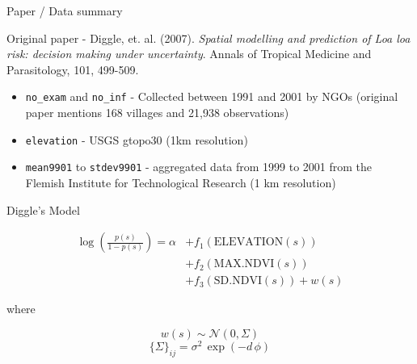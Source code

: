 \documentclass[11pt,ignorenonframetext,]{beamer}
\providecommand{\tightlist}{%
  \setlength{\itemsep}{0pt}\setlength{\parskip}{0pt}}
\begin{document}
\begin{frame}[fragile]{Paper / Data summary}
\protect\hypertarget{paper-data-summary}{}

Original paper - Diggle, et. al. (2007). \emph{Spatial modelling and
prediction of Loa loa risk: decision making under uncertainty}. Annals
of Tropical Medicine and Parasitology, 101, 499-509.

\vspace{4mm}

\begin{itemize}
\tightlist
\item
  \texttt{no\_exam} and \texttt{no\_inf} - Collected between 1991 and
  2001 by NGOs (original paper mentions 168 villages and 21,938
  observations)
\end{itemize}

\vspace{2mm}

\begin{itemize}
\tightlist
\item
  \texttt{elevation} - USGS gtopo30 (1km resolution)
\end{itemize}

\vspace{2mm}

\begin{itemize}
\tightlist
\item
  \texttt{mean9901} to \texttt{stdev9901} - aggregated data from 1999 to
  2001 from the Flemish Institute for Technological Research (1 km
  resolution)
\end{itemize}

\end{frame}

\begin{frame}{Diggle’s Model}
\protect\hypertarget{diggles-model}{}

\[ 
\begin{aligned}
\log \left( \frac{p(s)}{1-p(s)} \right) = \alpha &+ f_1(\text{ELEVATION}(s)) \\
&+ f_2(\text{MAX.NDVI}(s)) \\
&+ f_3(\text{SD.NDVI}(s)) + w(s) 
\end{aligned}
\]

where

\[ w(s) \sim \mathcal{N}(0, \Sigma) \]
\[ \{\Sigma\}_{ij} = \sigma^2 \, \exp(-d \,\phi) \]

\end{frame}
\end{document}
